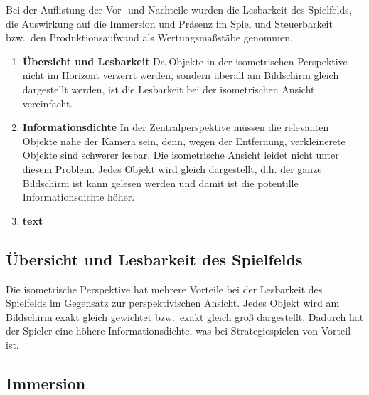 Bei der Auflistung der Vor- und Nachteile wurden die Lesbarkeit des Spielfelds, die Auswirkung auf die Immersion und Präsenz im Spiel und Steuerbarkeit bzw.\ den Produktionsaufwand als Wertungsmaßstäbe genommen.

\begin{enumerate}
	\item \textbf{Übersicht und Lesbarkeit} 
	Da Objekte in der isometrischen Perspektive nicht im Horizont verzerrt werden, sondern überall am Bildschirm gleich dargestellt werden, ist die Lesbarkeit bei der isometrischen Ansicht vereinfacht.
	
	\item \textbf{Informationsdichte}
	In der Zentralperspektive müssen die relevanten Objekte nahe der Kamera sein, denn, wegen der Entfernung, verkleinerete Objekte sind schwerer lesbar. Die isometrische Ansicht leidet nicht unter diesem Problem. Jedes Objekt wird gleich dargestellt, d.h. der ganze Bildschirm ist kann gelesen werden und damit ist die potentille Informationsdichte höher.
	\item \textbf{text}
\end{enumerate}

\subsection{Übersicht und Lesbarkeit des Spielfelds} 

Die isometrische Perspektive hat mehrere Vorteile bei der Lesbarkeit des Spielfelds im Gegensatz zur perspektivischen Ansicht. Jedes Objekt wird am Bildschirm exakt gleich gewichtet bzw.\ exakt gleich groß dargestellt. Dadurch hat der Spieler eine höhere Informationsdichte, was bei Strategie\-spielen von Vorteil ist.

\subsection{Immersion}
